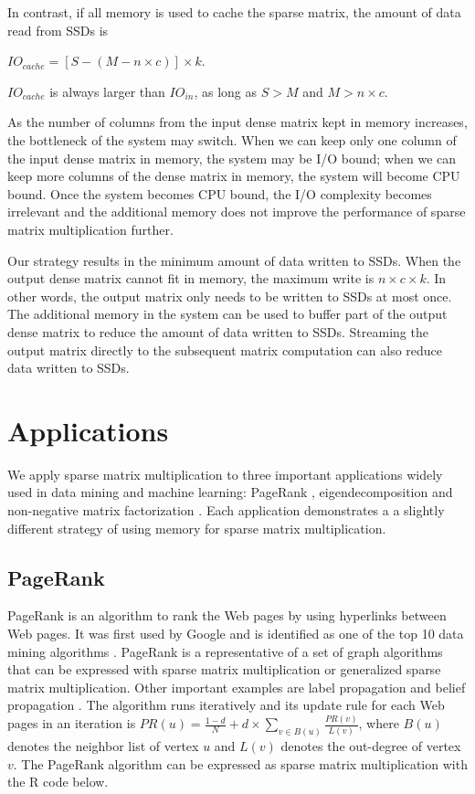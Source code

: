 \noindent In contrast, if all memory is used to cache the sparse matrix,
the amount of data read from SSDs is

$IO_{cache} = [S - (M - n \times c)] \times k$.

\noindent $IO_{cache}$ is always larger than $IO_{in}$, as long as $S > M$
and $M > n \times c$.

As the number of columns from the input dense matrix kept in memory increases,
the bottleneck of the system
may switch. When we can keep only one column of the input dense matrix in memory,
the system may be I/O bound; when we can keep more columns of the dense matrix
in memory, the system will become CPU bound. Once the system becomes CPU bound,
the I/O complexity becomes irrelevant and the additional memory does not improve
the performance of sparse matrix multiplication further.

Our strategy results in the minimum amount of data written to SSDs. When the output
dense matrix cannot fit in memory, the maximum write is $n \times c \times k$.
In other words, the output matrix only needs to be written to SSDs at most once.
The additional memory in the system can be used to buffer part of the output
dense matrix to reduce the amount of data written to SSDs. Streaming the output
matrix directly to the subsequent matrix computation can also reduce data written
to SSDs.

\section{Applications} \label{sec:apps}
We apply sparse matrix multiplication to three important applications widely
used in data mining and machine learning: PageRank \cite{pagerank},
eigendecomposition \cite{anasazi} and non-negative matrix factorization \cite{nmf}.
Each application demonstrates a a slightly different strategy of using memory
for sparse matrix multiplication.

\subsection{PageRank}
PageRank is an algorithm to rank the Web pages by using hyperlinks between Web
pages. It was first used by Google and is identified as one of the top 10 data
mining algorithms \cite{top10}. PageRank is a representative of a set of graph
algorithms that can be expressed with sparse matrix multiplication or generalized
sparse matrix multiplication. Other important examples are label propagation \cite{}
and belief propagation \cite{}. The algorithm runs iteratively and its update
rule for each Web pages in an iteration is
$PR(u) = \frac{1-d}{N} + d \times \sum\limits_{v \in B(u)} \frac{PR(v)}{L(v)}$,
where $B(u)$ denotes the neighbor list of vertex $u$ and $L(v)$ denotes
the out-degree of vertex $v$. The PageRank algorithm can be expressed as sparse
matrix multiplication with the R code below.

